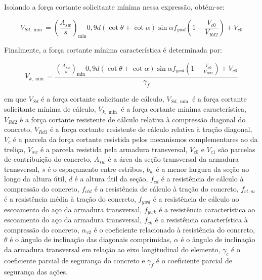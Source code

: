 Isolando a força cortante solicitante mínima nessa expressão, obtém-se:

\begin{equation}
V_{Sd,\min} =
\left(\frac{A_{sw}}{s}\right)_{\min}
0,9d(\cot\theta+\cot\alpha)
\sin\alpha f_{ywd}
\left(1-\frac{V_{c0}}{V_{Rd2}}\right)
+V_{c0}
\end{equation}

Finalmente, a força cortante mínima característica é determinada por:

\begin{equation}
V_{k,\min} =
\frac{
\left(\frac{A_{sw}}{s}\right)_{\min}
0,9d(\cot\theta+\cot\alpha)
\sin\alpha f_{ywd}
\left(1-\frac{V_{c0}}{V_{Rd2}}\right)
+V_{c0}
}{\gamma_f}
\end{equation}

em que $V_{Sd}$ é a força cortante solicitante de cálculo, $V_{Sd,\min}$ é a força cortante solicitante mínima de cálculo, $V_{k,\min}$ é a força cortante mínima característica, $V_{Rd2}$ é a força cortante resistente de cálculo relativa à compressão diagonal do concreto, $V_{Rd3}$ é a força cortante resistente de cálculo relativa à tração diagonal, $V_c$ é a parcela da força cortante resistida pelos mecanismos complementares ao da treliça, $V_{sw}$ é a parcela resistida pela armadura transversal, $V_{c0}$ e $V_{c1}$ são parcelas de contribuição do concreto, $A_{sw}$ é a área da seção transversal da armadura transversal, $s$ é o espaçamento entre estribos, $b_w$ é a menor largura da seção ao longo da altura útil, $d$ é a altura útil da seção, $f_{cd}$ é a resistência de cálculo à compressão do concreto, $f_{ctd}$ é a resistência de cálculo à tração do concreto, $f_{ct,m}$ é a resistência média à tração do concreto, $f_{ywd}$ é a resistência de cálculo ao escoamento do aço da armadura transversal, $f_{ywk}$ é a resistência característica ao escoamento do aço da armadura transversal, $f_{ck}$ é a resistência característica à compressão do concreto, $\alpha_{v2}$ é o coeficiente relacionado à resistência do concreto, $\theta$ é o ângulo de inclinação das diagonais comprimidas, $\alpha$ é o ângulo de inclinação da armadura transversal em relação ao eixo longitudinal do elemento, $\gamma_c$ é o coeficiente parcial de segurança do concreto e $\gamma_f$ é o coeficiente parcial de segurança das ações.